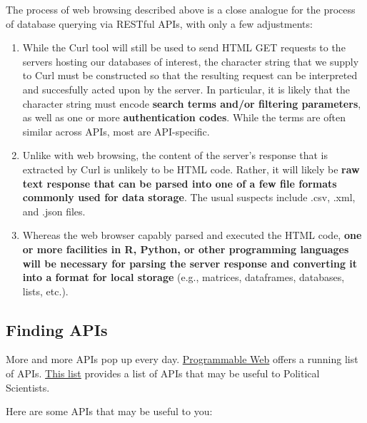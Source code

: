 \documentclass[
]{book}
\begin{document}
The process of web browsing described above is a close analogue for the process of database querying via RESTful APIs, with only a few adjustments:

\begin{enumerate}
\def\labelenumi{\arabic{enumi}.}
\item
  While the Curl tool will still be used to send HTML GET requests to the servers hosting our databases of interest, the character string that we supply to Curl must be constructed so that the resulting request can be interpreted and succesfully acted upon by the server. In particular, it is likely that the character string must encode \textbf{search terms and/or filtering parameters}, as well as one or more \textbf{authentication codes}. While the terms are often similar across APIs, most are API-specific.
\item
  Unlike with web browsing, the content of the server's response that is extracted by Curl is unlikely to be HTML code. Rather, it will likely be \textbf{raw text response that can be parsed into one of a few file formats commonly used for data storage}. The usual suspects include .csv, .xml, and .json files.
\item
  Whereas the web browser capably parsed and executed the HTML code, \textbf{one or more facilities in R, Python, or other programming languages will be necessary for parsing the server response and converting it into a format for local storage} (e.g., matrices, dataframes, databases, lists, etc.).
\end{enumerate}

\hypertarget{finding-apis}{%
\subsection{Finding APIs}\label{finding-apis}}

More and more APIs pop up every day. \href{https://www.programmableweb.com/apis/directory}{Programmable Web} offers a running list of APIs. \href{https://ucsd.libguides.com/c.php?g=90743\&p=3202435}{This list} provides a list of APIs that may be useful to Political Scientists.

Here are some APIs that may be useful to you:
\end{document}

